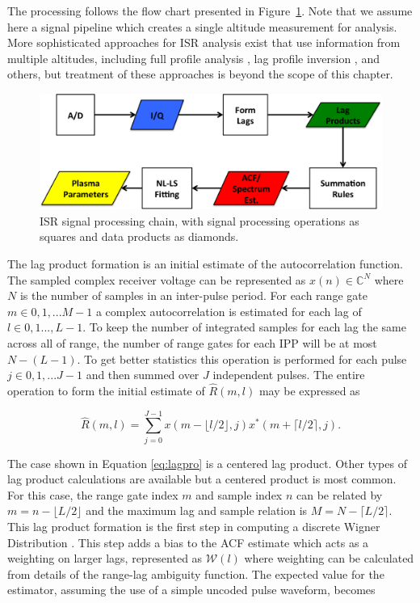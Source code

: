  
The processing follows the flow chart presented in Figure~\ref{fig:chain}.  
Note that we assume here a signal pipeline which creates a single altitude measurement for analysis. 
More sophisticated approaches for ISR analysis exist that use information from multiple altitudes, including full profile analysis \cite{RDS:RDS3308}, lag profile inversion \cite{Virtanen:20082vx}, and others, but treatment of these approaches is beyond the scope of this chapter.
\begin{figure}[!t]
\centering
\includegraphics[width=5.5in]{datastackchain}
\caption{ISR signal processing chain, with signal processing operations as squares and data products as diamonds.}
\label{fig:chain}
\end{figure}
The lag product formation is an initial estimate of the autocorrelation function. The sampled complex receiver voltage can be represented as $x(n) \in\mathbb{C}^N$ where $N$ is the number of samples in an inter-pulse period. For each range gate $m\in 0,1,...M-1$ a complex autocorrelation is estimated for each lag of $l \in 0,1...,L-1$. To keep the number of integrated samples for each lag the same across all of range, the number of range gates for each IPP will be at most $N-(L-1)$. To get better statistics this operation is performed for each pulse $j\in 0,1,...J-1$ and then summed over $J$ independent pulses. The entire operation to form the initial estimate of $\widehat{R}(m,l)$ may be expressed as

\begin{equation}
\label{eq:lagpro}
\widehat{R}(m,l) = \displaystyle\sum\limits_{j=0}^{J-1} x(m-\lfloor l/2\rfloor,j)x^*(m+\lceil l/2 \rceil,j).
\end{equation}

The case shown in Equation \ref{eq:lagpro} is a centered lag product.  Other types of lag product calculations are available but a centered product is most common. For this case, the range gate index $m$ and sample index $n$ can be related by $m=n-\lfloor L/2\rfloor$ and the maximum lag and sample relation is $M=N-\lceil L/2 \rceil$.  This lag product formation is the first step in computing a discrete Wigner Distribution \cite{TFAcohen}. This  step adds a bias to the ACF estimate which acts as a weighting on larger lags, represented as $\mathcal{W}(l)$ where weighting can be calculated from details of the range-lag ambiguity function. The expected value for the estimator, assuming the use of a simple uncoded pulse waveform, becomes

